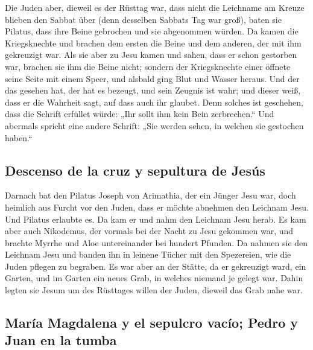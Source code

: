  Die Juden aber, dieweil es der Rüsttag war, dass nicht
die Leichname am Kreuze blieben den Sabbat über (denn desselben Sabbats
Tag war groß), baten sie Pilatus, dass ihre Beine gebrochen und sie
abgenommen würden.  Da kamen die Kriegsknechte und
brachen dem ersten die Beine und dem anderen, der mit ihm gekreuzigt
war.  Als sie aber zu Jesu kamen und sahen, dass er schon
gestorben war, brachen sie ihm die Beine nicht;  sondern
der Kriegsknechte einer öffnete seine Seite mit einem Speer, und alsbald
ging Blut und Wasser heraus.  Und der das gesehen hat,
der hat es bezeugt, und sein Zeugnis ist wahr; und dieser weiß, dass er
die Wahrheit sagt, auf dass auch ihr glaubet.  Denn
solches ist geschehen, dass die Schrift erfüllet würde: „Ihr sollt ihm
kein Bein zerbrechen.``  Und abermals spricht eine andere
Schrift: „Sie werden sehen, in welchen sie gestochen haben.``

\hypertarget{descenso-de-la-cruz-y-sepultura-de-jesuxfas}{%
\subsection{Descenso de la cruz y sepultura de
Jesús}\label{descenso-de-la-cruz-y-sepultura-de-jesuxfas}}

 Darnach bat den Pilatus Joseph von Arimathia, der ein
Jünger Jesu war, doch heimlich aus Furcht vor den Juden, dass er möchte
abnehmen den Leichnam Jesu. Und Pilatus erlaubte es. Da kam er und nahm
den Leichnam Jesu herab.  Es kam aber auch Nikodemus, der
vormals bei der Nacht zu Jesu gekommen war, und brachte Myrrhe und Aloe
untereinander bei hundert Pfunden.  Da nahmen sie den
Leichnam Jesu und banden ihn in leinene Tücher mit den Spezereien, wie
die Juden pflegen zu begraben.  Es war aber an der
Stätte, da er gekreuzigt ward, ein Garten, und im Garten ein neues Grab,
in welches niemand je gelegt war.  Dahin legten sie Jesum
um des Rüsttages willen der Juden, dieweil das Grab nahe war.

\hypertarget{maruxeda-magdalena-y-el-sepulcro-vacuxedo-pedro-y-juan-en-la-tumba}{%
\subsection{María Magdalena y el sepulcro vacío; Pedro y Juan en la
tumba}\label{maruxeda-magdalena-y-el-sepulcro-vacuxedo-pedro-y-juan-en-la-tumba}}

